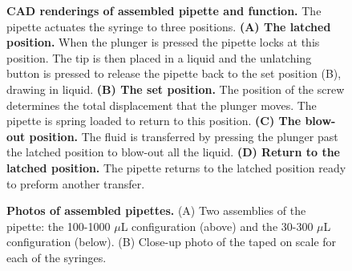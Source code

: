 \documentclass{nature}
\begin{document}
\begin{figure}
\caption{
{\bf CAD renderings of assembled pipette and function.} The pipette actuates the syringe to three positions. {\bf (A) The latched position.} When the plunger is pressed the pipette locks at this position. The tip is then placed in a liquid and the unlatching button is pressed to release the pipette back to the set position (B), drawing in liquid.  {\bf(B) The set position.} The position of the screw determines the total displacement that the plunger moves. The pipette is spring loaded to return to this position. {\bf (C) The blow-out position.} The fluid is transferred by pressing the plunger past the latched position to blow-out all the liquid. {\bf (D) Return to the latched position.} The pipette returns to the latched position ready to preform another transfer.
}
\label{fig2}
\end{figure}

\begin{figure}
\caption{
{\bf Photos of assembled pipettes.}  (A) Two assemblies of the pipette: the 100-1000 $\mu$L configuration (above) and the 30-300 $\mu$L configuration (below). (B) Close-up photo of the taped on scale for each of the syringes. 
}
\label{fig3}
\end{figure}
\end{document}
